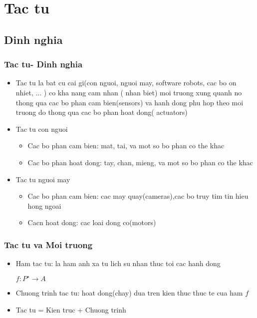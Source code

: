 \documentclass[12pt]{beamer}
\begin{document}
\section{Tac tu}
\subsection{Dinh nghia}
\begin{frame}
\frametitle{Tac tu- Dinh nghia}
\begin{itemize}
\item{Tac tu la bat cu cai gi(con nguoi, nguoi may, software robots, cac bo on nhiet, ... ) co kha nang cam nhan ( nhan biet) moi truong xung quanh no thong qua cac bo phan cam bien(sensors) va hanh dong phu hop theo moi truong do thong qua cac bo phan hoat dong( actuators)}
\item Tac tu con nguoi
\begin{itemize}
\item Cac bo phan cam bien: mat, tai, va mot so bo phan co the khac
\item Cac bo phan hoat dong: tay, chan, mieng, va mot so bo phan co the khac
\end{itemize}
\item Tac tu nguoi may
\begin{itemize}
\item Cac bo phan cam bien: cac may quay(cameras),cac bo truy tim tin hieu hong ngoai
\item Cacn hoat dong: cac loai dong co(motors)
\end{itemize}
\end{itemize}
\end{frame}
\begin{frame}
\frametitle{Tac tu va Moi truong}
\begin{itemize}
\item Ham tac tu: la ham anh xa tu lich su nhan thuc toi cac hanh dong\\
\centerline{$f:P^\star \to A$}
\item Chuong trinh tac tu: hoat dong(chay) dua tren kien thuc thuc te cua ham $f$
\item Tac tu = Kien truc + Chuong trinh
\end{itemize}
\end{frame}
\end{document}
